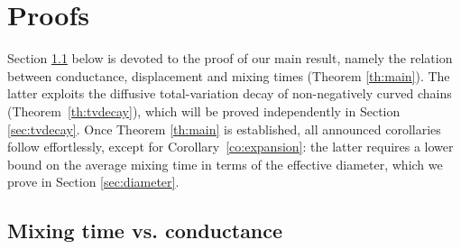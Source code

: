 \documentclass[JEP,XML,SOM,Unicode,NoEqCountersInSection,published]{cedram}
\theoremstyle{definition}
\begin{document}
\section{Proofs}\label{sec:proofs}
Section \ref{sec:conductance} below is devoted to the proof of our main result, namely the relation between conductance, displacement and mixing times (Theorem \ref{th:main}). The latter exploits the diffusive total-variation decay of non-negatively curved chains (Theorem~\ref{th:tvdecay}), which will be proved independently in Section \ref{sec:tvdecay}.
Once Theorem \ref{th:main} is established, all announced corollaries follow effortlessly, except for Corollary~\ref{co:expansion}: the latter requires a lower bound on the average mixing time in terms of the effective diameter, which we prove in Section \ref{sec:diameter}.

\subsection{Mixing time vs. conductance}
\label{sec:conductance}
\end{document}
